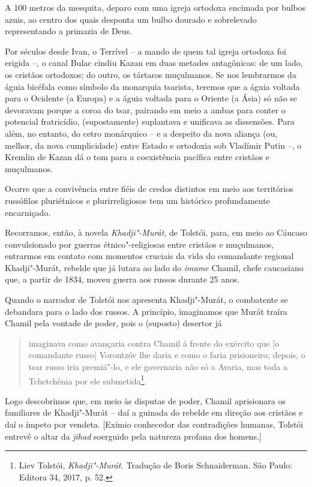 A 100 metros da mesquita, deparo com uma igreja ortodoxa %
encimada por bulbos azuis, ao centro dos quais desponta um bulbo dourado
e sobrelevado representando a primazia de Deus.

Por séculos desde Ivan, o Terrível -- a mando de quem tal igreja
ortodoxa foi erigida --, o canal Bulac cindiu Kazan em duas metades
antagônicas: de um lado, os cristãos ortodoxos; do outro, os tártaros
muçulmanos. Se nos lembrarmos da águia bicéfala como símbolo da
monarquia tsarista, teremos que a águia voltada para o Ocidente (a
Europa) e a águia voltada para o Oriente (a Ásia) só não se devoravam
porque a coroa do tsar, pairando em meio a ambas para conter o potencial
fratricídio, (supostamente) suplantava e unificava as dissensões. Para
além, no entanto, do cetro monárquico -- e a despeito da nova aliança
(ou, melhor, da nova cumplicidade) entre Estado e ortodoxia sob Vladímir
Putin --, o Kremlin de Kazan dá o tom para a coexistência pacífica entre
cristãos e muçulmanos.

Ocorre que a convivência entre fiéis de credos distintos em meio aos
territórios russófilos pluriétnicos e plurirreligiosos tem um histórico
profundamente encarniçado.

Recorramos, então, à novela \emph{Khadji"-Murát}, de Tolstói, para, %
em meio ao Cáucaso convulsionado por guerras étnico"-religiosas entre
cristãos e muçulmanos, entrarmos em contato com momentos cruciais da
vida do comandante regional Khadji"-Murát, rebelde que já lutara ao lado
do \emph{imame} Chamil, chefe caucasiano que, a partir de 1834, moveu
guerra aos russos durante 25 anos.

Quando o narrador de Tolstói nos apresenta Khadji"-Murát, o combatente se
debandara para o lado dos russos. A princípio, imaginamos que Murát
traíra Chamil pela vontade de poder, pois o (suposto) desertor já

\begin{quote}
imaginava como avançaria contra Chamil à frente do exército que {[}o
comandante russo{]} Vorontzóv lhe daria e como o faria prisioneiro;
depois, o tsar russo iria premiá"-lo, e ele governaria não só a Avaria,
mas toda a Tchetchênia por ele submetida\footnote{Liev Tolstói,
  \emph{Khadji"-Murát.} Tradução de Boris Schnaiderman. São Paulo:
  Editora 34, 2017, p. 52.}.
\end{quote}

Logo descobrimos que, em meio às disputas de poder, Chamil aprisionara
os familiares de Khadji"-Murát -- daí a guinada do rebelde em direção aos
cristãos e daí o ímpeto por vendeta. {[}Exímio conhecedor das
contradições humanas, Tolstói entrevê o altar da \emph{jihad} soerguido pela natureza profana dos homens.{]}

